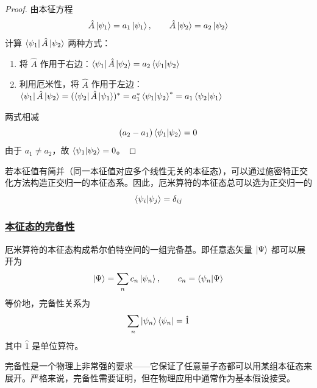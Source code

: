 \begin{proof}
    由本征方程
    \begin{equation}
        \hat{A}\ket{\psi_1} = a_1\ket{\psi_1}, \qquad \hat{A}\ket{\psi_2} = a_2\ket{\psi_2}
    \end{equation}
    计算 $\bra{\psi_1}\hat{A}\ket{\psi_2}$ 两种方式：
    \begin{enumerate}
        \item 将 $\hat{A}$ 作用于右边：$\bra{\psi_1}\hat{A}\ket{\psi_2} = a_2\braket{\psi_1}{\psi_2}$
        \item 利用厄米性，将 $\hat{A}$ 作用于左边：$\bra{\psi_1}\hat{A}\ket{\psi_2} = (\bra{\psi_2}\hat{A}\ket{\psi_1})^* = a_1^*\braket{\psi_1}{\psi_2}^* = a_1\braket{\psi_2}{\psi_1}$
    \end{enumerate}
    两式相减
    \begin{equation}
        (a_2 - a_1)\braket{\psi_1}{\psi_2} = 0
    \end{equation}
    由于 $a_1 \neq a_2$，故 $\braket{\psi_1}{\psi_2} = 0$。
\end{proof}

若本征值有简并（同一本征值对应多个线性无关的本征态），可以通过施密特正交化方法构造正交归一的本征态系。因此，厄米算符的本征态总可以选为正交归一的
\begin{equation}
    \braket{\psi_i}{\psi_j} = \delta_{ij}
\end{equation}

\subsubsection{\protect\hyperlink{:}{本征态的完备性}}

\begin{theorem}[厄米算符本征态的完备性]
    厄米算符的本征态构成希尔伯特空间的一组完备基。即任意态矢量 $\ket{\Psi}$ 都可以展开为
    \begin{equation}
        \ket{\Psi} = \sum_n c_n\ket{\psi_n}, \qquad c_n = \braket{\psi_n}{\Psi}
    \end{equation}
    等价地，完备性关系为
    \begin{equation}
        \sum_n \ket{\psi_n}\bra{\psi_n} = \hat{1}
    \end{equation}
    其中 $\hat{1}$ 是单位算符。
\end{theorem}

\begin{remark}
    完备性是一个物理上非常强的要求——它保证了任意量子态都可以用某组本征态来展开。严格来说，完备性需要证明，但在物理应用中通常作为基本假设接受。
\end{remark}

